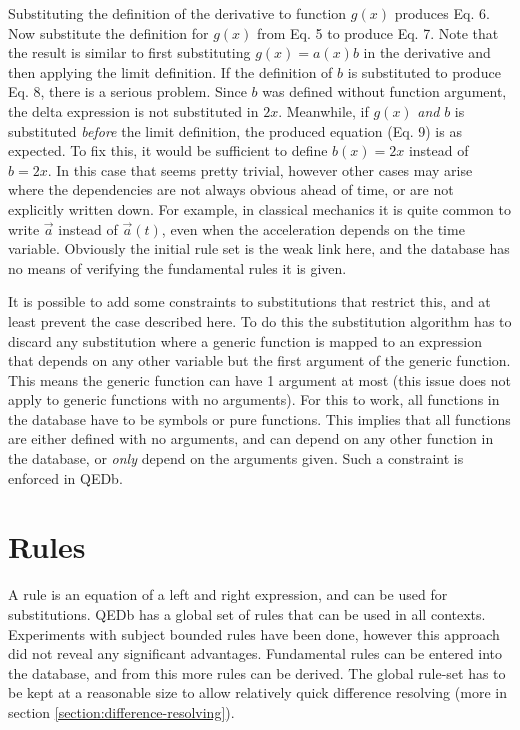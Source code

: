 \documentclass{article}
\begin{document}
Substituting the definition of the derivative to function $g(x)$ produces Eq. 6. Now substitute the definition for $g(x)$ from Eq. 5 to produce Eq. 7. Note that the result is similar to first substituting $g(x)=a(x)b$ in the derivative and then applying the limit definition. If the definition of $b$ is substituted to produce Eq. 8, there is a serious problem. Since $b$ was defined without function argument, the delta expression is not substituted in $2x$. Meanwhile, if  $g(x)$ \emph{and} $b$ is substituted \emph{before} the limit definition, the produced equation (Eq. 9) is as expected. To fix this, it would be sufficient to define $b(x)=2x$ instead of $b=2x$. In this case that seems pretty trivial, however other cases may arise where the dependencies are not always obvious ahead of time, or are not explicitly written down. For example, in classical mechanics it is quite common to write $\vec{a}$ instead of $\vec{a}(t)$, even when the acceleration depends on the time variable. Obviously the initial rule set is the weak link here, and the database has no means of verifying the fundamental rules it is given. \par
It is possible to add some constraints to substitutions that restrict this, and at least prevent the case described here. To do this the substitution algorithm has to discard any substitution where a generic function is mapped to an expression that depends on any other variable but the first argument of the generic function. This means the generic function can have 1 argument at most (this issue does not apply to generic functions with no arguments). For this to work, all functions in the database have to be symbols or pure functions. This implies that all functions are either defined with no arguments, and can depend on any other function in the database, or \emph{only} depend on the arguments given. Such a constraint is enforced in QEDb.

\section{Rules}
A rule is an equation of a left and right expression, and can be used for substitutions. QEDb has a global set of rules that can be used in all contexts. Experiments with subject bounded rules have been done, however this approach did not reveal any significant advantages. Fundamental rules can be entered into the database, and from this more rules can be derived. The global rule-set has to be kept at a reasonable size to allow relatively quick difference resolving (more in section \ref{section:difference-resolving}).
\end{document}
